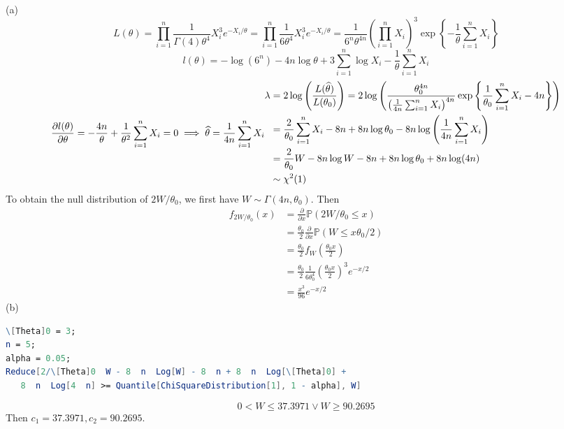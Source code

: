 (a)
\[
L(\theta)=\prod_{i=1}^{n} \frac{1}{\Gamma(4)\theta^{4}}X_i^{3}e^{ -X_i/\theta }=\prod_{i=1}^{n} \frac{1}{6\theta^{4}}X_i^{3}e^{ -X_i/\theta }=\frac{1}{6^{n}\theta^{4n}}\left( \prod_{i=1}^{n} X_i \right)^{3}\exp \left\{  -\frac{1}{\theta}\sum_{i=1}^{n} X_i  \right\}
\]
\[
l(\theta)=-\log(6^{n})-4n\log\theta+3\sum_{i=1}^{n} \log X_i-\frac{1}{\theta}\sum_{i=1}^{n} X_i
\]
\[
\frac{ \partial l(\theta) }{ \partial \theta } =-\frac{4n}{\theta}+\frac{1}{\theta^{2}}\sum_{i=1}^{n} X_i=0\implies\widehat{\theta}=\frac{1}{4n}\sum_{i=1}^{n} X_i
$$ $$
\begin{aligned}
\lambda & =2\log\left( \frac{L(\widehat{\theta})}{L(\theta_0)} \right)=2\log\left( \frac{\theta_0^{4n}}{\left( \frac{1}{4n}\sum_{i=1}^{n}X_i  \right)^{4n}}\exp \left\{  \frac{1}{\theta_0}\sum_{i=1}^{n} X_i-4n  \right\} \right) \\
 & =\frac{2}{\theta_0}\sum_{i=1}^{n} X_i-8n +8n\log\theta_0 -8n\log\left( \frac{1}{4n}\sum_{i=1}^{n} X_i \right) \\
 & =\frac{2}{\theta_0}W-8n\log W-8n+8n\log\theta_0 +8n\log(4n) \\
 & \sim \chi^{2}(1)
\end{aligned}
\]
To obtain the null distribution of $2W/\theta_0$, we first have $W\sim \Gamma(4n,\theta_0)$. Then
\[
\begin{aligned}
f_{2W/\theta_0}(x) & =\frac{ \partial   }{ \partial x } \mathbb{P}(2W/\theta_0\leq x) \\
 & =\frac{\theta_0}{2}\frac{ \partial   }{ \partial x } \mathbb{P}(W\leq x\theta_0/2 ) \\
 & =\frac{\theta_0}{2}f_{W}\left( \frac{\theta_0x}{2} \right) \\
 & =\frac{\theta_0}{2}\frac{1}{6\theta_0^{4}} \left( \frac{\theta_0x}{2} \right)^{3}e^{ -x/2 } \\
 & =\frac{x^{3}}{96}e^{ -x/2  }
\end{aligned}
\]
(b)

\begin{lstlisting}[language=mathematica]
\[Theta]0 = 3; 
n = 5;
alpha = 0.05;
Reduce[2/\[Theta]0  W - 8  n  Log[W] - 8  n + 8  n  Log[\[Theta]0] + 
   8  n  Log[4  n] >= Quantile[ChiSquareDistribution[1], 1 - alpha], W]
\end{lstlisting}
\[
0<W\leq 37.3971\lor W\geq 90.2695
\]
Then $c_1=37.3971,c_2=90.2695$.

